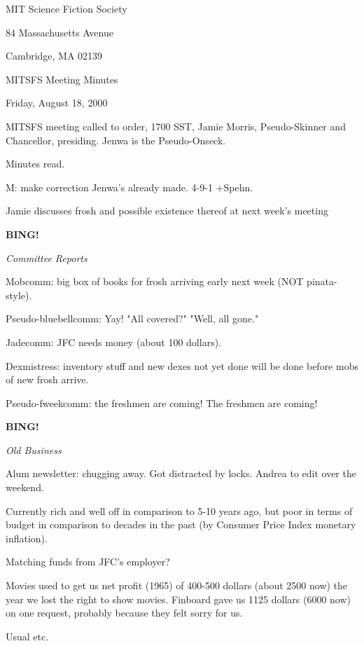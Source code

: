 \documentclass[12pt]{article}
\newcommand{\bing}{{\bf BING!} }
\newcommand{\goto}[1]{\bing \vskip 12pt \centerline{{\em{#1}}}}
\begin{document}
\begin{center}

MIT Science Fiction Society 

84 Massachusetts Avenue

Cambridge, MA 02139

\vspace{12pt}

MITSFS Meeting Minutes 

Friday, August 18, 2000

\end{center}
 
\vspace{18pt}

\setlength{\parskip}{6pt}

\noindent
MITSFS meeting called to order, 1700 SST, Jamie Morris, Pseudo-Skinner and Chancellor, presiding.  Jenwa is the Pseudo-Onseck.

Minutes read.

M: make correction Jenwa's already made. 4-9-1 +Spehn.

Jamie discusses frosh and possible existence thereof at next week's meeting

\goto{Committee Reports}

Mobcomm: big box of books for frosh arriving early next week (NOT pinata-style).

Pseudo-bluebellcomm: Yay! "All covered?" "Well, all gone."

Jadecomm: JFC needs money (about 100 dollars).

Dexmistress: inventory stuff and new dexes not yet done will be done before mobs of new frosh arrive.

Pseudo-fweekcomm: the freshmen are coming! The freshmen are coming!

\goto{Old Business}

Alum newsletter: chugging away. Got distracted by locks. Andrea to edit over the weekend.

Currently rich and well off in comparison to 5-10 years ago, but poor in terms of budget in comparison to decades in the past (by Consumer Price Index monetary inflation).

Matching funds from JFC's employer?

Movies used to get us net profit (1965) of 400-500 dollars (about 2500 now) the year we lost the right to show movies. Finboard gave us 1125 dollars (6000 now) on one request, probably because they felt sorry for us.

Usual etc.
\end{document}
